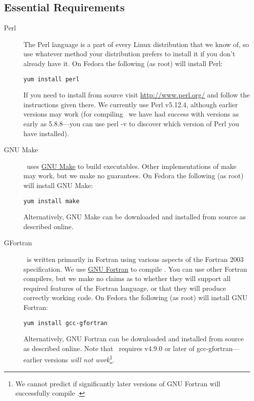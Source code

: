 \subsection{Essential Requirements}\label{sec:requirementsEssential}

\begin{description}
 \item [Perl] The Perl language is a part of every Linux distribution that we know of, so use whatever method your distribution prefers to install it if you don't already have it. On Fedora the following (as root) will install Perl:
\begin{verbatim}
yum install perl
\end{verbatim}
If you need to install from source visit \href{http://www.perl.org/}{\normalfont \ttfamily http://www.perl.org/} and follow the instructions given there. We currently use Perl v5.12.4, although earlier versions may work (for compiling \glc\ we have had success with versions as early as 5.8.8---you can use {\normalfont \ttfamily perl -v} to discover which version of Perl you have installed).

\item [GNU Make] \glc\ uses \href{http://www.gnu.org/software/make/}{GNU Make} to build executables. Other implementations of {\normalfont \ttfamily make} may work, but we make no guarantees. On Fedora the following (as root) will install GNU Make:
\begin{verbatim}
yum install make
\end{verbatim}
Alternatively, GNU Make can be downloaded and installed from source as described online.

\item [GFortran] \glc\ is written primarily in Fortran using various aspects of the Fortran 2003 specification. We use \href{http://gcc.gnu.org/fortran/}{GNU Fortran} to compile \glc. You can use other Fortran compilers, but we make no claims as to whether they will support all required features of the Fortran language, or that they will produce correctly working code. On Fedora the following (as root) will install GNU Fortran:
\begin{verbatim}
yum install gcc-gfortran
\end{verbatim}
Alternatively, GNU Fortran can be downloaded and installed from source as described online. Note that \glc\ requires v4.9.0 or later of {\normalfont \ttfamily gcc-gfortran}---earlier versions \emph{will not work}\footnote{We cannot predict if significantly later versions of GNU Fortran will successfully compile \protect\glc.}.


\end{description}
